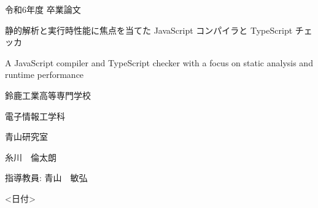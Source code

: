 \documentclass[
  luatex,
  paper=a4paper,
  fontsize=11pt,
  report,
  jlreq_notes,
]{jlreq}
\begin{document}
\begin{titlepage}
  \noindent
  \centering

  \vfill

  \LARGE{令和6年度 卒業論文}

  \vspace{10mm}

  \Huge{静的解析と実行時性能に焦点を当てた JavaScript コンパイラと TypeScript チェッカ}

  \vspace{2mm}

  \LARGE{A JavaScript compiler and TypeScript checker with a focus on static analysis and runtime performance}

  \vfill

  \Large{鈴鹿工業高等専門学校}

  \Large{電子情報工学科}

  \Large{青山研究室}

  \vspace{5mm}

  \LARGE{糸川　倫太朗}

  \vfill

  \Large{指導教員: 青山　敏弘}

  \vspace{2mm}

  \Large{<日付>}
\end{titlepage}


\tableofcontents

\clearpage




\end{document}
